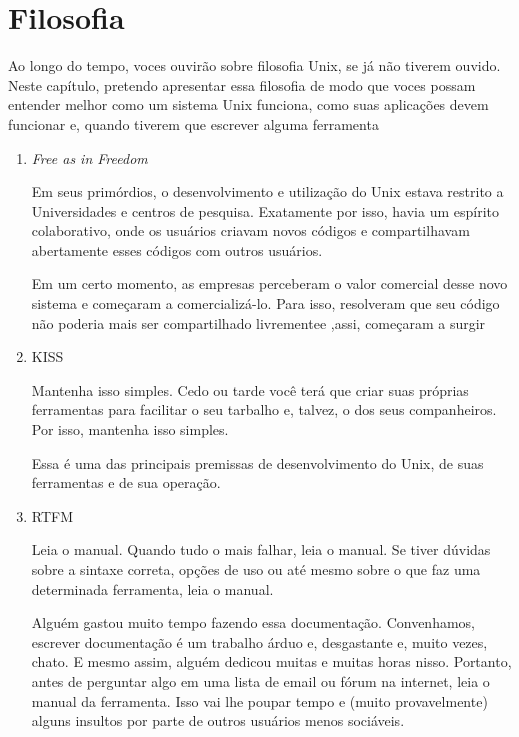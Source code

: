 
\chapter{Filosofia}
Ao longo do tempo, voces ouvirão sobre filosofia Unix, se já não tiverem
ouvido. Neste capítulo, pretendo apresentar essa filosofia de modo que voces
possam entender melhor como um sistema Unix funciona, como suas aplicações
devem funcionar e, quando tiverem que escrever alguma ferramenta 

\begin{enumerate}
\item{\emph{Free as in Freedom}}

Em seus primórdios, o desenvolvimento e utilização do Unix estava restrito a
Universidades e centros de pesquisa. Exatamente por isso, havia um espírito
colaborativo, onde os usuários criavam novos códigos e compartilhavam
abertamente esses códigos com outros usuários.

Em um certo momento, as empresas perceberam o valor comercial desse novo
sistema e começaram a comercializá-lo. Para isso, resolveram que seu código
não poderia mais ser compartilhado livrementee ,assi, começaram a surgir

\item{KISS}

Mantenha isso simples. Cedo ou tarde você terá que criar suas próprias
ferramentas para facilitar o seu tarbalho e, talvez, o dos seus companheiros.
Por isso, mantenha isso simples. 

Essa é uma das principais premissas de desenvolvimento do Unix, de suas
ferramentas e de sua operação.

\item{RTFM}

Leia o manual. Quando tudo o mais falhar, leia o manual. Se tiver dúvidas
sobre a sintaxe correta, opções de uso ou até mesmo sobre o que faz uma
determinada ferramenta, leia o manual.

Alguém gastou muito tempo fazendo essa documentação. Convenhamos, escrever
documentação é um trabalho árduo e, desgastante e, muito vezes, chato. E mesmo
assim, alguém dedicou muitas e muitas horas nisso. Portanto, antes de
perguntar algo em uma lista de email ou fórum na internet, leia o manual da
ferramenta. Isso vai lhe poupar tempo e (muito provavelmente) alguns insultos
por parte de outros usuários menos sociáveis.

\end{enumerate}

